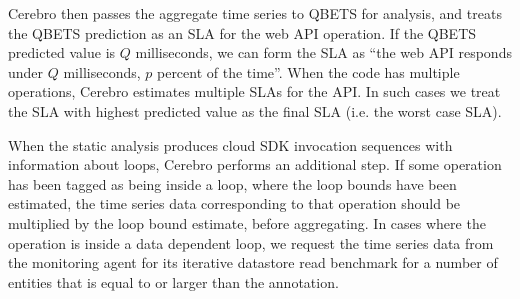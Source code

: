 Cerebro then passes the aggregate time series to QBETS for analysis, and
treats the QBETS prediction as an SLA for the web API operation.
If the QBETS predicted value is $Q$ milliseconds, 
we can form the SLA as ``the web API responds 
under $Q$ milliseconds, $p$ percent of the time''. 
When the code has multiple operations, Cerebro estimates multiple SLAs for the API. In
such cases we treat the SLA with highest predicted value 
as the final SLA (i.e. the worst case SLA).

When the static analysis produces cloud SDK invocation 
sequences with information about loops, Cerebro performs an additional step.
If some operation has been tagged as being inside a loop, where the loop
bounds have been estimated, the time series data corresponding to that 
operation should be multiplied 
by the loop bound estimate, before aggregating. In cases where the operation 
is inside a data dependent loop, we request the time series data from 
the monitoring agent for its iterative datastore read benchmark 
for a number of entities that is equal to or larger than the annotation. 